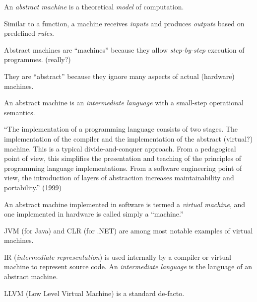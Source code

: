 \documentclass{article}
\begin{document}

\pptToc



An \emph{abstract machine} is a theoretical \emph{model} of computation.

Similar to a function, a machine receives \emph{inputs} and produces \emph{outputs} based on predefined \emph{rules}.

Abstract machines are ``machines'' because they allow \emph{step-by-step} execution of programmes. (really?)

They are ``abstract'' because they ignore many aspects of actual (hardware) machines.

An abstract machine is an \emph{intermediate language} with a small-step operational semantics.

\plush{}


``The implementation of a programming language consists of two
stages. The implementation of the compiler and the implementation of the abstract (virtual?) machine.
This is a typical divide-and-conquer approach.
From a pedagogical point of view, this simplifies the presentation and
teaching of the principles of programming language implementations.
From a software engineering point of view, the introduction of layers of
abstraction increases maintainability and portability.'' (\href{https://www.sciencedirect.com/science/article/abs/pii/S0167739X99000886}{1999})

\plush{}


An abstract machine implemented in software is termed a \emph{virtual machine},
and one implemented in hardware is called simply a ``machine.''

JVM (for Java) and CLR (for .NET) are among most notable examples of virtual machines.

IR (\emph{intermediate representation}) is used internally by a compiler or virtual machine to represent source code.
An \emph{intermediate language} is the language of an abstract machine.

\plush{}


LLVM (Low Level Virtual Machine) is a standard de-facto.

\end{document}
